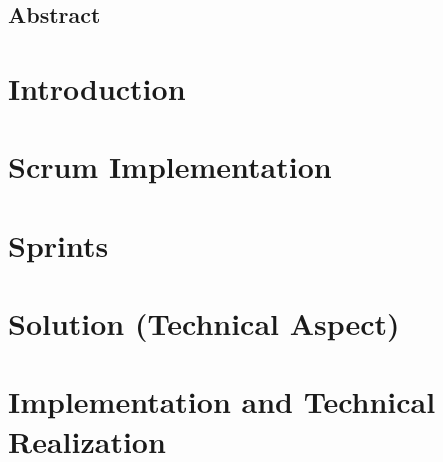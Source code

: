 \documentclass[11pt, a4paper, oneside]{report}
\begin{document}
\clearpage
{}
{}
\section*{Abstract}
                             

\newpage
{}                                        

\chapter[Introduction]{Introduction}             
\label{chap:intro}                                            
                             

\chapter[Scrum Implementation]{Scrum Implementation}             
\label{chap:scrum}                                            
                             

\chapter[Sprints]{Sprints}             
\label{chap:sprints}                                            
                             

\chapter[Solution (Technical Aspect)]{Solution (Technical Aspect)}             
\label{chap:solution}                                            
                             

\chapter[Implementation and Technical Realization]{Implementation and Technical Realization}             
\label{chap:implement}                                            
                             
\end{document}
